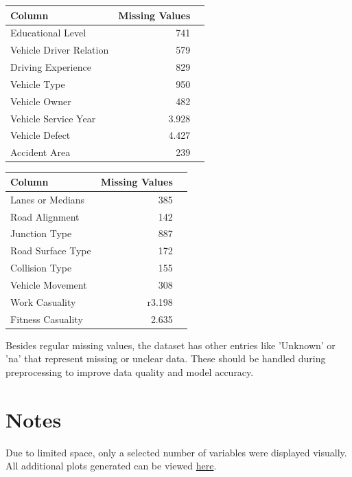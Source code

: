 \documentclass{article}
\begin{document}
\begin{table}[H]
    \parbox{.40\linewidth}{
        \begin{tabular}{l|r|c}
            \textbf{Column} & \textbf{Missing Values} \\\hline
            Educational Level & 741 \\
            Vehicle Driver Relation & 579\\
            Driving Experience & 829\\
            Vehicle Type & 950\\
            Vehicle Owner & 482\\
            Vehicle Service Year & 3.928\\
            Vehicle Defect & 4.427\\
            Accident Area & 239\\
        \end{tabular}
}
    \hfill
    \parbox{.40\linewidth}{
        \begin{tabular}{l|r|c}
           \textbf{Column} & \textbf{Missing Values} \\\hline
            Lanes or Medians & 385 \\
            Road Alignment & 142\\
            Junction Type & 887\\
            Road Surface Type & 172\\
            Collision Type & 155\\
            Vehicle Movement & 308\\
            Work Casuality & r3.198\\
            Fitness Casuality & 2.635\\
        \end{tabular}}
\end{table}

Besides regular missing values, the dataset has other entries like 'Unknown' or 'na' that represent missing or unclear data. These should be handled during preprocessing to improve data quality and model accuracy.

\section{Notes}
Due to limited space, only a selected number of variables were displayed visually.
All additional plots generated can be viewed
\href{https://github.com/amyteresakostas/MachineLearning_2024_TUW}{here}.
\end{document}
